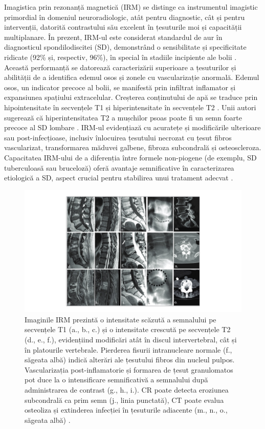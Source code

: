 \documentclass[romanian,12pt,a4paper]{article}
\begin{document}
Imagistica prin rezonanță magnetică (IRM) se distinge ca instrumentul
imagistic primordial în domeniul neuroradiologic, atât pentru
diagnostic, cât și pentru intervenții, datorită contrastului său
excelent în țesuturile moi și capacității multiplanare. În prezent,
IRM-ul este considerat standardul de aur în diagnosticul
spondilodiscitei (SD), demonstrând o sensibilitate și specificitate
ridicate (92\% și, respectiv, 96\%), în special în stadiile incipiente
ale bolii
\cite{SpondylodiscitisDiagnosisTreatment2017}\cite{CurrentDiagnosisTreatment2008}
. Această performanță se datorează caracterizării superioare a
țesuturilor și abilității de a identifica edemul osos și zonele cu
vascularizație anormală. Edemul osos, un indicator precoce al bolii, se
manifestă prin infiltrat inflamator și expansiunea spațiului
extracelular. Creșterea conținutului de apă se traduce prin
hipointensitate în secvențele T1 și hiperintensitate în secvențele T2
\cite{SpinalInfectionState2013}. Unii autori sugerează că
hiperintensitatea T2 a mușchilor psoas poate fi un semn foarte precoce
al SD lombare \cite{ImagingPsoasSign2016}. IRM-ul evidențiază cu
acuratețe și modificările ulterioare sau post-infecțioase, inclusiv
înlocuirea țesutului necrozat cu țesut fibros vascularizat,
transformarea măduvei galbene, fibroza subcondrală și osteoscleroza.
Capacitatea IRM-ului de a diferenția între formele non-piogene (de
exemplu, SD tuberculoasă sau bruceloză) oferă avantaje semnificative în
caracterizarea etiologică a SD, aspect crucial pentru stabilirea unui
tratament adecvat
\cite{SpinalInfectionState2013}\cite{DiagnosticInterventionalManagement2020}.

\begin{figure}
\centering
\includegraphics[width=\textwidth]{Files/IRM-important.png}
\caption{Imaginile IRM prezintă o intensitate scăzută a semnalului pe
secvențele T1 (a., b., c.) și o intensitate crescută pe secvențele T2
(d., e., f.), evidențiind modificări atât în discul intervertebral, cât
și în platourile vertebrale. Pierderea fisurii intranucleare normale
(f., săgeata albă) indică alterări ale țesutului fibros din nucleul
pulpos. Vascularizația post-inflamatorie și formarea de țesut
granulomatos pot duce la o intensificare semnificativă a semnalului după
administrarea de contrast (g., h., i.). CR poate detecta eroziunea
subcondrală ca prim semn (j., linia punctată), CT poate evalua osteoliza
și extinderea infecției în țesuturile adiacente (m., n., o., săgeata
albă)
\cite{DiagnosticInterventionalManagement2020}.}\label{IRM-important}
\end{figure}
\end{document}
